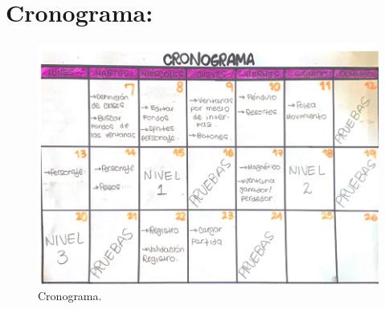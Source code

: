 \documentclass{report}   %
\begin{document}
\section{Cronograma:}
\begin{figure}[H]
      \centering
      \captionsetup{justification=centering}
      \includegraphics[scale=0.7]{crono.PNG}
      \caption{Cronograma.}
      \label{fig:Cronograma.}
   \end{figure}
\end{document}
